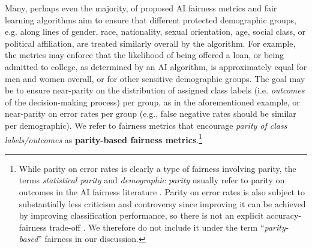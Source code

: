 \documentclass[11pt,dvipdfm]{article}
\begin{document}
Many, perhaps even the majority, of proposed AI fairness metrics and fair learning algorithms aim to ensure that different protected demographic groups, e.g. along lines of gender, race, nationality, sexual orientation, age, social class, or political affiliation, are treated similarly overall by the algorithm.  For example, the metrics may enforce that the likelihood of being offered a loan, or being admitted to college, as determined by an AI algorithm, is approximately equal for men and women overall, or for other sensitive demographic groups.  The goal may be to ensure near-parity on the distribution of assigned class labels (i.e. \emph{outcomes} of the decision-making process) per group, as in the aforementioned example, or near-parity on error rates per group (e.g., false negative rates should be similar per demographic).  We refer to fairness metrics that encourage \emph{parity of class labels/outcomes} as \textbf{parity-based fairness metrics}.\footnote{While parity on error rates is clearly a type of fairness involving parity, the terms \emph{statistical parity} and \emph{demographic parity} usually refer to parity on outcomes in the AI fairness literature \cite{dwork2012fairness}.  Parity on error rates is also subject to substantially less criticism and controversy since improving it can be achieved by improving classification performance, so there is not an explicit accuracy-fairness trade-off \cite{hardt2016equality}. We therefore do not include it under the term ``\emph{parity-based}'' fairness in our discussion. }
\end{document}
